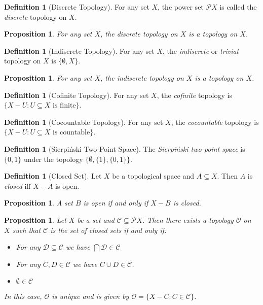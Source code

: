 \documentclass{book}
\newtheorem{prop}[ax]{Proposition}
\theoremstyle{definition}
\newtheorem{df}[ax]{Definition}
\begin{document}
\begin{df}[Discrete Topology]
For any set $X$, the power set $\mathcal{P} X$ is called the \emph{discrete} topology on $X$.
\end{df}

\begin{prop}
For any set $X$, the discrete topology on $X$ is a topology on $X$.
\end{prop}

\begin{df}[Indiscrete Topology]
For any set $X$, the \emph{indiscrete} or \emph{trivial} topology on $X$ is  $\{ \emptyset, X \}$.
\end{df}

\begin{prop}
For any set $X$, the indiscrete topology on $X$ is a topology on $X$.
\end{prop}

\begin{df}[Cofinite Topology]
For any set $X$, the \emph{cofinite} topology is $\{ X - U : U \subseteq X \text{ is finite} \}$.
\end{df}

\begin{df}[Cocountable Topology]
For any set $X$, the \emph{cocountable} topology is $\{ X - U : U \subseteq X \text{ is countable} \}$.
\end{df}

\begin{df}[Sierpi\'{n}ski Two-Point Space]
The \emph{Sierpi\'{n}ski two-point space} is $\{0,1\}$ under the topology $\{ \emptyset, \{1\}, \{0,1\} \}$.
\end{df}

\begin{df}[Closed Set]
Let $X$ be a topological space and $A \subseteq X$. Then $A$ is \emph{closed} iff $X - A$ is open.
\end{df}

\begin{prop}
A set $B$ is open if and only if $X - B$ is closed.
\end{prop}

\begin{prop}
Let $X$ be a set and $\mathcal{C} \subseteq \mathcal{P} X$. Then there exists a topology $\mathcal{O}$ on $X$ such that $\mathcal{C}$ is the set of closed sets if and only if:
\begin{itemize}
\item For any $\mathcal{D} \subseteq \mathcal{C}$ we have $\bigcap \mathcal{D} \in \mathcal{C}$
\item For any $C, D \in \mathcal{C}$ we have $C \cup D \in \mathcal{C}$.
\item $\emptyset \in \mathcal{C}$
\end{itemize}
In this case, $\mathcal{O}$ is unique and is given by $\mathcal{O} = \{ X - C : C \in \mathcal{C} \}$.
\end{prop}
\end{document}
